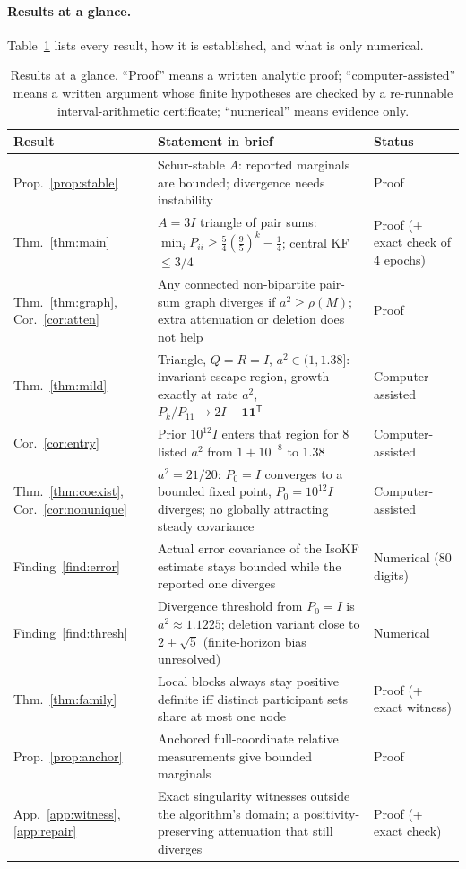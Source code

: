 \documentclass[11pt,a4paper]{article}
\numberwithin{equation}{section}
\theoremstyle{remark}\newtheorem{remark}[theorem]{Remark}
\newcommand{\T}{^{\mathsf T}}
\newcommand{\one}{\mathbf 1}
\begin{document}
\paragraph{Results at a glance.}
Table~\ref{tab:glance} lists every result, how it is established, and what is only numerical.

\begin{table}[ht]
\centering\small
\caption{Results at a glance. ``Proof'' means a written analytic proof; ``computer-assisted''
means a written argument whose finite hypotheses are checked by a re-runnable
interval-arithmetic certificate; ``numerical'' means evidence only.}
\label{tab:glance}
\begin{tabularx}{\textwidth}{>{\raggedright\arraybackslash}p{}>{\raggedright\arraybackslash}X>{\raggedright\arraybackslash}p{}}
\toprule
Result & Statement in brief & Status\\
\midrule
Prop.~\ref{prop:stable} & Schur-stable $A$: reported marginals are bounded; divergence needs instability & Proof\\
Thm.~\ref{thm:main} & $A=3I$ triangle of pair sums: $\min_i P_{ii}\ge\frac54(\frac95)^k-\frac14$; central KF $\le 3/4$ & Proof (+ exact check of 4 epochs)\\
Thm.~\ref{thm:graph}, Cor.~\ref{cor:atten} & Any connected non-bipartite pair-sum graph diverges if $a^2\ge\rho(M)$; extra attenuation or deletion does not help & Proof\\
Thm.~\ref{thm:mild} & Triangle, $Q=R=I$, $a^2\in(1,1.38]$: invariant escape region, growth exactly at rate $a^{2}$, $P_k/P_{11}\to 2I-\one\one\T$ & Computer-assisted\\
Cor.~\ref{cor:entry} & Prior $10^{12}I$ enters that region for 8 listed $a^2$ from $1+10^{-8}$ to $1.38$ & Computer-assisted\\
Thm.~\ref{thm:coexist}, Cor.~\ref{cor:nonunique} & $a^2=21/20$: $P_0=I$ converges to a bounded fixed point, $P_0=10^{12}I$ diverges; no globally attracting steady covariance & Computer-assisted\\
Finding~\ref{find:error} & Actual error covariance of the IsoKF estimate stays bounded while the reported one diverges & Numerical (80 digits)\\
Finding~\ref{find:thresh} & Divergence threshold from $P_0=I$ is $a^2\approx1.1225$; deletion variant close to $2+\sqrt5$ (finite-horizon bias unresolved) & Numerical\\
Thm.~\ref{thm:family} & Local blocks always stay positive definite iff distinct participant sets share at most one node & Proof (+ exact witness)\\
Prop.~\ref{prop:anchor} & Anchored full-coordinate relative measurements give bounded marginals & Proof\\
App.~\ref{app:witness}, \ref{app:repair} & Exact singularity witnesses outside the algorithm's domain; a positivity-preserving attenuation that still diverges & Proof (+ exact check)\\
\bottomrule
\end{tabularx}
\end{table}
\end{document}
